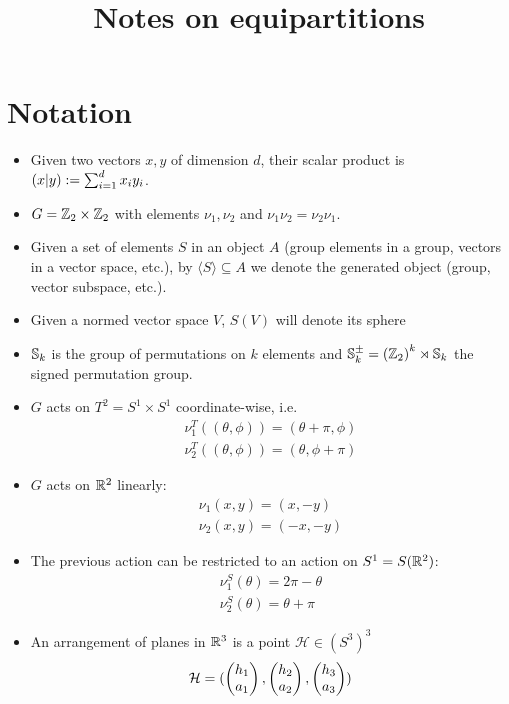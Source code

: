 \documentclass[10pt]{article}
\title{Notes on equipartitions}
\author{}
\begin{document}
\maketitle
\graphicspath{{./figs/}}

\section{Notation}
\begin{itemize}
\item Given two vectors $x, y$ of dimension $d$,  their scalar product is $\left( x \vert y\right):=\sum_{i=1}^d x_iy_i$.
\item $G=\mathbb{Z}_2\times\mathbb{Z}_2$ with elements $\nu_1, \nu_2$ and $\nu_1\nu_2 = \nu_2\nu_1$.
  \item Given a set of elements $S$ in an object $A$ (group elements in a group, vectors in a vector space, etc.), by $\langle S\rangle\subseteq A$ we denote the generated object (group, vector subspace, etc.).
  \item Given a normed vector space $V$, $S(V)$ will denote its sphere
  \item $\mathbb{S}_k$ is the group of permutations on $k$ elements and $\mathbb{S}_k^{\pm} = \left( \mathbb{Z}_2 \right)^k \rtimes \mathbb{S}_k$ the signed permutation group.
  \item $G$ acts on $T^2 = S^1\times S^1$ coordinate-wise, i.e.
    \begin{align*}
      \nu_1^T((\theta, \phi)) = (\theta + \pi, \phi) \\
      \nu_2^T((\theta, \phi)) = (\theta, \phi + \pi)
    \end{align*}
  \item $G$ acts on $\mathbb{R}^2$ linearly:
    \begin{align*}
      \nu_1(x,y) = (x, -y)\\
      \nu_2(x,y) = (-x, -y)
    \end{align*}
  \item The previous action can be restricted to an action on $S^1=S(\mathbb{R}^2)$:
    \begin{align*}
      \nu_1^S(\theta) = 2\pi - \theta \\
      \nu_2^S(\theta) = \theta + \pi
    \end{align*}
  \item An arrangement of planes in $\mathbb{R}^3$ is a point $\mathcal{H} \in \left(S^3\right)^3$
    \[
      \mathcal{H}=(\begin{pmatrix}h_1\\a_1\end{pmatrix},\begin{pmatrix}h_2\\a_2\end{pmatrix}, \begin{pmatrix}h_3\\a_3\end{pmatrix})
\]
\end{itemize}
\end{document}
